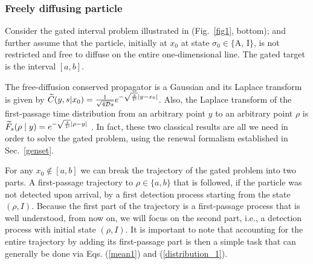 \subsubsection*{Freely diffusing particle}\label{sub:free}

Consider the gated interval problem illustrated in (Fig.~\ref{fig1}, bottom); and further assume that the particle, initially at $x_0$ at state $\sigma_{0} \in \{\text{A, I}\}$, is not restricted and free to diffuse on the entire one-dimensional line. The gated target is the interval $[a,b]$.

The free-diffusion conserved propagator is a Gaussian and its Laplace transform is given by $ \widetilde{C}(y, s | x_{0}) = \frac{1}{\sqrt{4 \mathcal{D} s}} e^{-\sqrt{\frac{s}{\mathcal{D}}} \vert{y-x_{0}}\vert}$. Also, the Laplace transform of the first-passage time distribution from an arbitrary point $y$ to an arbitrary point $\rho$ is $\widetilde{F}_s(\rho \mid y) = e^{-\sqrt{\frac{s}{\mathcal{D}}}\vert{\rho-y}\vert}$ \cite{redner2001}. In fact, these two classical results are all we need in order to solve the gated problem, using the renewal formalism established in Sec.~\ref{genset}. 

For any $x_0 \notin[a,b]$ we can break the trajectory of the gated problem into two parts. A first-passage trajectory to $\rho \in \{a,b\}$ that is followed, if the particle was not detected upon arrival, by a first detection process starting from the state $(\rho,I)$. Because the first part of the trajectory is a first-passage process that is well understood, from now on, we will focus on the second part, i.e., a detection process with initial state $(\rho,I)$. It is important to note that accounting for the entire trajectory by adding its first-passage part is then a simple task that can generally be done via Eqs. (\ref{mean1}) and (\ref{distribution_1}).


